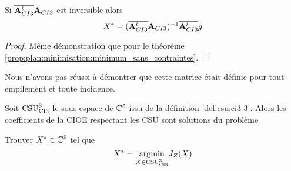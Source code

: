     \begin{prop}
      \label{prop:cylindre:minimisation:minimum_sans_contraintes}
      Si \(\conj{\mA_{CI3}^t}\mA_{CI3}\) est inversible alors
      \begin{equation*}
        X^* = (\conj{\mA_{CI3}^t}\mA_{CI3})^{-1}\conj{\mA_{CI3}^t}g
      \end{equation*}
    \end{prop}

    \begin{proof}
      Même démonstration que pour le théorème \ref{prop:plan:minimisation:minimum_sans_contraintes}.
    \end{proof}

    Nous n'avons pas réussi à démontrer que cette matrice était définie pour tout empilement et toute incidence.

    \begin{thm}

      Soit \(\CSU[3]{CI3}\) le sous-espace de \(\CC^5\) issu de la définition \ref{def:csu:ci3-3}.
      Alors les coefficients de la CIOE respectant les CSU sont solutions du problème

      Trouver \(X^* \in \CC^5\) tel que
      \begin{equation*}
        X^* = \argmin{X\in \CSU[3]{CI3}}  J_Z(X)
      \end{equation*}
    \end{thm}

